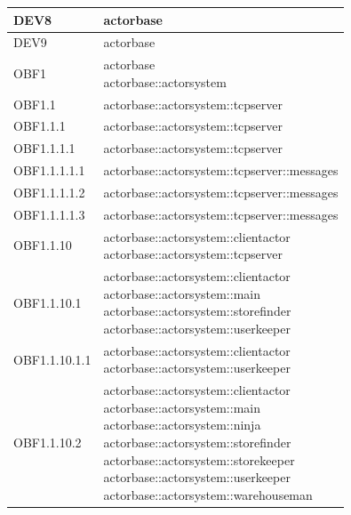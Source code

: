 \documentclass{scalatekids-article}
\begin{document}
\begin{longtable}[H]{|p{3.5cm}|p{7.5cm}|}
\hline
DEV8 & \multiLineCell[t]{actorbase\\}\\
\hline
DEV9 & \multiLineCell[t]{actorbase\\}\\
\hline
OBF1 & \multiLineCell[t]{actorbase\\actorbase::actorsystem\\}\\
\hline
OBF1.1 & \multiLineCell[t]{actorbase::actorsystem::tcpserver\\}\\
\hline
OBF1.1.1 & \multiLineCell[t]{actorbase::actorsystem::tcpserver\\}\\
\hline
OBF1.1.1.1 & \multiLineCell[t]{actorbase::actorsystem::tcpserver\\}\\
\hline
OBF1.1.1.1.1 & \multiLineCell[t]{actorbase::actorsystem::tcpserver::messages\\}\\
\hline
OBF1.1.1.1.2 & \multiLineCell[t]{actorbase::actorsystem::tcpserver::messages\\}\\
\hline
OBF1.1.1.1.3 & \multiLineCell[t]{actorbase::actorsystem::tcpserver::messages\\}\\
\hline
OBF1.1.10 & \multiLineCell[t]{actorbase::actorsystem::clientactor\\actorbase::actorsystem::tcpserver\\}\\
\hline
OBF1.1.10.1 & \multiLineCell[t]{actorbase::actorsystem::clientactor\\actorbase::actorsystem::main\\actorbase::actorsystem::storefinder\\actorbase::actorsystem::userkeeper\\}\\
\hline
OBF1.1.10.1.1 & \multiLineCell[t]{actorbase::actorsystem::clientactor\\actorbase::actorsystem::userkeeper\\}\\
\hline
OBF1.1.10.2 & \multiLineCell[t]{actorbase::actorsystem::clientactor\\actorbase::actorsystem::main\\actorbase::actorsystem::ninja\\actorbase::actorsystem::storefinder\\actorbase::actorsystem::storekeeper\\actorbase::actorsystem::userkeeper\\actorbase::actorsystem::warehouseman\\}\\

\end{longtable}
\end{document}
